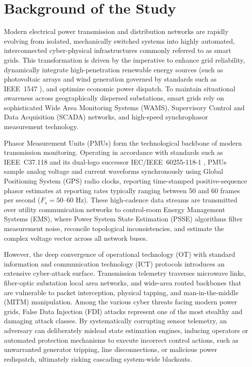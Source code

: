 \documentclass[11pt,a4paper]{report}
\begin{document}
\section{Background of the Study}
Modern electrical power transmission and distribution networks are rapidly
evolving from isolated, mechanically switched systems into highly automated,
interconnected cyber-physical infrastructures commonly referred to as smart
grids. This transformation is driven by the imperative to enhance grid
reliability, dynamically integrate high-penetration renewable energy sources
(such as photovoltaic arrays and wind generation governed by standards such as IEEE~1547 \cite{ieee1547}), and optimize economic power
dispatch. To maintain situational awareness across geographically dispersed
substations, smart grids rely on sophisticated Wide Area Monitoring Systems
(WAMS), Supervisory Control and Data Acquisition (SCADA) networks, and
high-speed synchrophasor measurement technology.

Phasor Measurement Units (PMUs) form the technological backbone of modern
transmission monitoring. Operating in accordance with standards such as
IEEE~C37.118 and its dual-logo successor IEC/IEEE~60255-118-1 \cite{ieeeC37118,iec60255},
PMUs sample analog voltage and current waveforms synchronously using Global
Positioning System (GPS) radio clocks, reporting time-stamped positive-sequence
phasor estimates at reporting rates typically ranging between 50 and 60 frames
per second ($F_s = 50\text{--}60\text{ Hz}$). These high-cadence data streams
are transmitted over utility communication networks to control-room Energy
Management Systems (EMS), where Power System State Estimation (PSSE) algorithms
filter measurement noise, reconcile topological inconsistencies, and estimate
the complex voltage vector across all network buses.

However, the deep convergence of operational technology (OT) with standard
information and communication technology (ICT) protocols introduces an extensive
cyber-attack surface. Transmission telemetry traverses microwave links, fiber-optic
substation local area networks, and wide-area routed backbones that are vulnerable
to packet interception, physical tapping, and man-in-the-middle (MITM) manipulation.
Among the various cyber threats facing modern power grids, False Data Injection
(FDI) attacks represent one of the most stealthy and damaging attack classes.
By systematically corrupting sensor telemetry, an adversary can deliberately
mislead state estimation engines, inducing operators or automated protection
mechanisms to execute incorrect control actions, such as unwarranted generator
tripping, line disconnections, or malicious power redispatch, ultimately risking
cascading system-wide blackouts.
\end{document}
